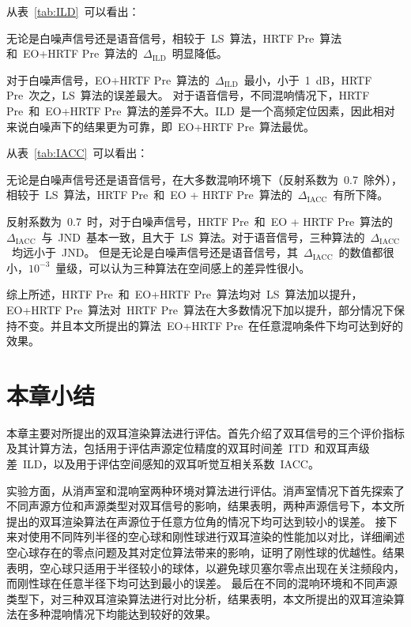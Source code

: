 从表~\ref{tab:ILD}~可以看出：
\begin{inparaenum}[（1）]

\item 无论是白噪声信号还是语音信号，相较于~LS~算法，HRTF Pre~算法和~EO+HRTF Pre~算法的~$\Delta_{\text{ILD}}$~明显降低。

\item 对于白噪声信号，EO+HRTF Pre~算法的~$\Delta_{\text{ILD}}$~最小，小于~1~dB，HRTF Pre~次之，LS~算法的误差最大。 对于语音信号，不同混响情况下，HRTF Pre~和~EO+HRTF Pre~算法的差异不大。ILD~是一个高频定位因素，因此相对来说白噪声下的结果更为可靠，即~EO+HRTF Pre~算法最优。

\end{inparaenum}


从表~\ref{tab:IACC}~可以看出：
\begin{inparaenum}[（1）]

\item 无论是白噪声信号还是语音信号，在大多数混响环境下（反射系数为~0.7~除外），相较于~LS~算法，HRTF Pre~和~EO + HRTF Pre~算法的~$\Delta_{\text{IACC}}$~有所下降。

\item 反射系数为~0.7~时，对于白噪声信号，HRTF Pre~和~EO + HRTF Pre~算法的~$\Delta_{\text{IACC}}$~与~JND~基本一致，且大于~LS~算法。对于语音信号，三种算法的~$\Delta_{\text{IACC}}$~均远小于~JND。
    但是无论是白噪声信号还是语音信号，其~$\Delta_ {\text{IACC}}$~的数值都很小，$10^{-3}$~量级，可以认为三种算法在空间感上的差异性很小。

\end{inparaenum}

综上所述，HRTF Pre~和~EO+HRTF Pre~算法均对~LS~算法加以提升，EO+HRTF Pre~算法对~HRTF Pre~算法在大多数情况下加以提升，部分情况下保持不变。并且本文所提出的算法~EO+HRTF Pre~在任意混响条件下均可达到好的效果。



\section{本章小结}

本章主要对所提出的双耳渲染算法进行评估。首先介绍了双耳信号的三个评价指标及其计算方法，包括用于评估声源定位精度的双耳时间差~ITD~和双耳声级差~ILD，以及用于评估空间感知的双耳听觉互相关系数~IACC。

实验方面，从消声室和混响室两种环境对算法进行评估。消声室情况下首先探索了不同声源方位和声源类型对双耳信号的影响，结果表明，两种声源信号下，本文所提出的双耳渲染算法在声源位于任意方位角的情况下均可达到较小的误差。
接下来对使用不同阵列半径的空心球和刚性球进行双耳渲染的性能加以对比，详细阐述空心球存在的零点问题及其对定位算法带来的影响，证明了刚性球的优越性。结果表明，空心球只适用于半径较小的球体，以避免球贝塞尔零点出现在关注频段内，而刚性球在任意半径下均可达到最小的误差。
最后在不同的混响环境和不同声源类型下，对三种双耳渲染算法进行对比分析，结果表明，本文所提出的双耳渲染算法在多种混响情况下均能达到较好的效果。